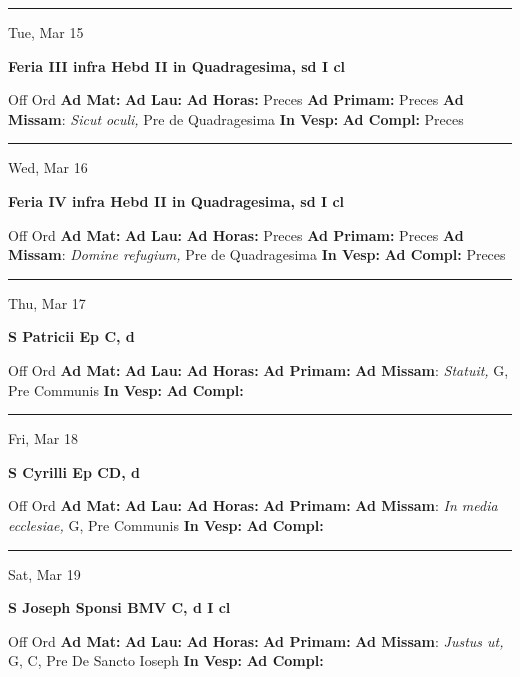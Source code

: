 \documentclass[letterpaper, 10pt]{article}
\begin{document}
\hrule
\begin{center}
Tue, Mar 15
\end{center}\textbf{ \large Feria III infra Hebd II in Quadragesima, \textnormal{\normalsize sd I cl}}
\begin{justify}
Off Ord
\textbf{Ad Mat: }
\textbf{Ad Lau: }
\textbf{Ad Horas: }Preces
\textbf{Ad Primam: }Preces
\textbf{Ad Missam}: \textit{Sicut oculi,} Pre de Quadragesima
\textbf{In Vesp: }
\textbf{Ad Compl: }Preces\end{justify}



\hrule
\begin{center}
Wed, Mar 16
\end{center}\textbf{ \large Feria IV infra Hebd II in Quadragesima, \textnormal{\normalsize sd I cl}}
\begin{justify}
Off Ord
\textbf{Ad Mat: }
\textbf{Ad Lau: }
\textbf{Ad Horas: }Preces
\textbf{Ad Primam: }Preces
\textbf{Ad Missam}: \textit{Domine refugium,} Pre de Quadragesima
\textbf{In Vesp: }
\textbf{Ad Compl: }Preces\end{justify}



\hrule
\begin{center}
Thu, Mar 17
\end{center}\textbf{ \large S Patricii Ep C, \textnormal{\normalsize d}}
\begin{justify}
Off Ord
\textbf{Ad Mat: }
\textbf{Ad Lau: }
\textbf{Ad Horas: }
\textbf{Ad Primam: }
\textbf{Ad Missam}: \textit{Statuit,} G, Pre Communis
\textbf{In Vesp: }
\textbf{Ad Compl: }\end{justify}



\hrule
\begin{center}
Fri, Mar 18
\end{center}\textbf{ \large S Cyrilli Ep CD, \textnormal{\normalsize d}}
\begin{justify}
Off Ord
\textbf{Ad Mat: }
\textbf{Ad Lau: }
\textbf{Ad Horas: }
\textbf{Ad Primam: }
\textbf{Ad Missam}: \textit{In media ecclesiae,} G, Pre Communis
\textbf{In Vesp: }
\textbf{Ad Compl: }\end{justify}



\hrule
\begin{center}
Sat, Mar 19
\end{center}\textbf{ \large S Joseph Sponsi BMV C, \textnormal{\normalsize d I cl}}
\begin{justify}
Off Ord
\textbf{Ad Mat: }
\textbf{Ad Lau: }
\textbf{Ad Horas: }
\textbf{Ad Primam: }
\textbf{Ad Missam}: \textit{Justus ut,} G, C, Pre De Sancto Ioseph
\textbf{In Vesp: }
\textbf{Ad Compl: }\end{justify}
\end{document}
